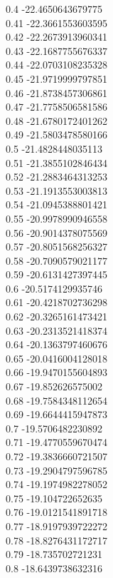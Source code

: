 {0.4	-22.4650643679775\\
0.41	-22.3661553603595\\
0.42	-22.2673913960341\\
0.43	-22.1687755676337\\
0.44	-22.0703108235328\\
0.45	-21.9719999797851\\
0.46	-21.8738457306861\\
0.47	-21.7758506581586\\
0.48	-21.6780172401262\\
0.49	-21.5803478580166\\
0.5	-21.4828448035113\\
0.51	-21.3855102846434\\
0.52	-21.2883464313253\\
0.53	-21.1913553003813\\
0.54	-21.0945388801421\\
0.55	-20.9978990946558\\
0.56	-20.9014378075569\\
0.57	-20.8051568256327\\
0.58	-20.7090579021177\\
0.59	-20.6131427397445\\
0.6	-20.5174129935746\\
0.61	-20.4218702736298\\
0.62	-20.3265161473421\\
0.63	-20.2313521418374\\
0.64	-20.1363797460676\\
0.65	-20.0416004128018\\
0.66	-19.9470155604893\\
0.67	-19.852626575002\\
0.68	-19.7584348112654\\
0.69	-19.6644415947873\\
0.7	-19.5706482230892\\
0.71	-19.4770559670474\\
0.72	-19.3836660721507\\
0.73	-19.2904797596785\\
0.74	-19.1974982278052\\
0.75	-19.104722652635\\
0.76	-19.0121541891718\\
0.77	-18.9197939722272\\
0.78	-18.8276431172717\\
0.79	-18.735702721231\\
0.8	-18.6439738632316\\
}
